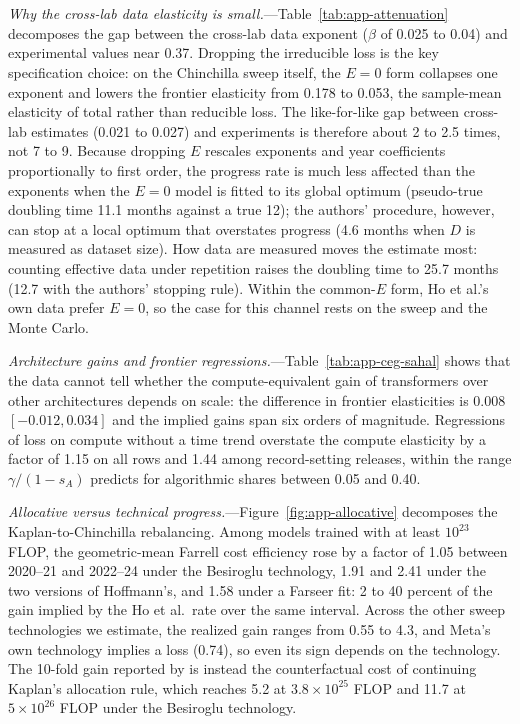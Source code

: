 \emph{Why the cross-lab data elasticity is small.}---Table~\ref{tab:app-attenuation} decomposes the gap between the
cross-lab data exponent ($\hat\beta$ of 0.025 to 0.04) and experimental values near 0.37. Dropping the irreducible
loss is the key specification choice: on the Chinchilla sweep itself, the $E=0$ form collapses one exponent and lowers
the frontier elasticity from 0.178 to 0.053, the sample-mean elasticity of total rather than reducible loss. The
like-for-like gap between cross-lab estimates (0.021 to 0.027) and experiments is therefore about 2 to 2.5 times, not 7
to 9. Because dropping $E$ rescales exponents and year coefficients proportionally to first order, the progress rate
is much less affected than the exponents when the $E=0$ model is fitted to its global optimum (pseudo-true doubling
time 11.1 months against a true 12); the authors' procedure, however, can stop at a local optimum that overstates
progress (4.6 months when $D$ is measured as dataset size). How data are measured moves the estimate most: counting
effective data under repetition raises the doubling time to 25.7 months (12.7 with the authors' stopping rule). Within
the common-$E$ form, Ho et al.'s own data prefer $E=0$, so the case for this channel rests on the sweep and the Monte
Carlo.

\emph{Architecture gains and frontier regressions.}---Table~\ref{tab:app-ceg-sahal} shows that the data cannot tell
whether the compute-equivalent gain of transformers over other architectures depends on scale: the difference in
frontier elasticities is 0.008 $[-0.012,0.034]$ and the implied gains span six orders of magnitude. Regressions of loss
on compute without a time trend overstate the compute elasticity by a factor of 1.15 on all rows and 1.44 among
record-setting releases, within the range $\gamma/(1-s_A)$ predicts for algorithmic shares between 0.05 and 0.40.

\emph{Allocative versus technical progress.}---Figure~\ref{fig:app-allocative} decomposes the Kaplan-to-Chinchilla
rebalancing. Among models trained with at least $10^{23}$ FLOP, the geometric-mean Farrell cost efficiency rose by a
factor of 1.05 between 2020--21 and 2022--24 under the Besiroglu technology, 1.91 and 2.41 under the two versions of
Hoffmann's, and 1.58 under a Farseer fit: 2 to 40 percent of the gain implied by the Ho et al.\ rate over the same
interval. Across the other sweep technologies we estimate, the realized gain ranges from 0.55 to 4.3, and
Meta's own technology implies a loss (0.74), so even its sign depends on the technology. The 10-fold gain reported by
\citet{gundlach2025origin} is instead the counterfactual cost of continuing Kaplan's allocation rule, which reaches 5.2
at $3.8\times10^{25}$ FLOP and 11.7 at $5\times10^{26}$ FLOP under the Besiroglu technology.

